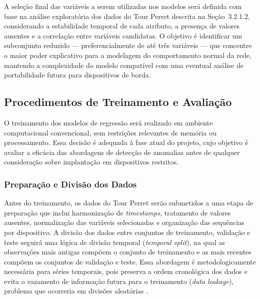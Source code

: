 A seleção final das variáveis a serem utilizadas nos modelos será definida 
com base na análise exploratória dos dados do Tour Perret descrita na 
Seção~3.2.1.2, considerando a estabilidade temporal de cada atributo, a 
presença de valores ausentes e a correlação entre variáveis candidatas. O 
objetivo é identificar um subconjunto reduzido — preferencialmente de até 
três variáveis — que concentre o maior poder explicativo para a modelagem do 
comportamento normal da rede, mantendo a complexidade do modelo compatível 
com uma eventual análise de portabilidade futura para dispositivos de borda.


\subsection{Procedimentos de Treinamento e Avaliação}

O treinamento dos modelos de regressão será realizado em ambiente 
computacional convencional, sem restrições relevantes de memória ou 
processamento. Essa decisão é adequada à fase atual do projeto, cujo 
objetivo é avaliar a eficácia das abordagens de detecção de anomalias antes 
de qualquer consideração sobre implantação em dispositivos restritos.


\subsubsection{Preparação e Divisão dos Dados}

Antes do treinamento, os dados do Tour Perret serão submetidos a uma etapa 
de preparação que inclui harmonização de \textit{timestamps}, tratamento de 
valores ausentes, normalização das variáveis selecionadas e organização das 
sequências por dispositivo. A divisão dos dados entre conjuntos de 
treinamento, validação e teste seguirá uma lógica de divisão temporal 
(\textit{temporal split}), na qual as observações mais antigas compõem o 
conjunto de treinamento e as mais recentes compõem os conjuntos de validação 
e teste. Essa abordagem é metodologicamente necessária para séries temporais, 
pois preserva a ordem cronológica dos dados e evita o vazamento de informação 
futura para o treinamento (\textit{data leakage}), problema que ocorreria em 
divisões aleatórias \cite{bergmeir2012, hyndman2021}.


